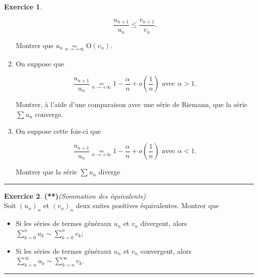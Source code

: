 \documentclass[a4paper,11pt]{article}
\theoremstyle{definition}
\newtheorem{exo}{Exercice} %
\newcommand{\disp}{\displaystyle}
\begin{document}
\begin{minipage}{1\linewidth}
\begin{minipage}[t]{0.48\linewidth}
\begin{exo}
\begin{enumerate}
		$$
		\frac{u_{n+1}}{u_{n}} \leq \frac{v_{n+1}}{v_{n}} .
		$$
		
		Montrer que $u_{n} \underset{n \rightarrow+\infty}{=} \mathrm{O}\left(v_{n}\right)$.
		
		\item On suppose que
		
		$$
		\dfrac{u_{n+1}}{u_{n}} \underset{n \rightarrow+\infty}{=} 1-\dfrac{\alpha}{n}+o\left(\frac{1}{n}\right) \text { avec } \alpha>1 .
		$$
		
		Montrer, à l'aide d'une comparaison avec une série de Riemann, que la série $\sum u_{n}$ converge.
		
		\item On suppose cette fois-ci que
		
		$$
		\frac{u_{n+1}}{u_{n}} \underset{n \rightarrow+\infty}{=} 1-\frac{\alpha}{n}+o\left(\frac{1}{n}\right) \text { avec } \alpha<1 .
		$$
		
		Montrer que la série $\sum u_{n}$ diverge
		
	\end{enumerate}
	
	\centering\rule{1\linewidth}{0.6pt}\end{exo}



\begin{exo}\textbf{(**)}\quad\textit{(Sommation des équivalents)}\\[0.2cm]

Soit $\left(u_{n}\right)_{n}$ et $\left(v_{n}\right)_{n}$ deux suites positives équivalentes. Montrer que
\begin{itemize}[$\bullet$]
	\item Si les séries de termes généraux $u_{n}$ et $v_{n}$ divergent, alors $\disp\sum_{k=0}^{n} u_{k} \sim \sum_{k=0}^{n} v_{k}$;
	\item Si les séries de termes généraux $u_{n}$ et $v_{n}$ convergent, alors $\disp \sum_{k=n}^{\infty} u_{k} \sim \sum_{k=n}^{\infty} v_{k}$.
\end{itemize}

	\centering\rule{1\linewidth}{0.6pt}\end{exo}


\end{minipage}\end{minipage} \newpage
\end{document}

